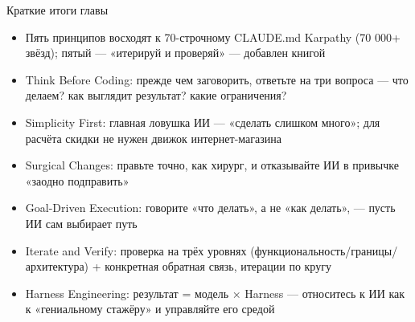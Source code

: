 \begin{tcbsummary}{Краткие итоги главы}
\begin{itemize}
  \item Пять принципов восходят к 70-строчному CLAUDE.md Karpathy (70 000+ звёзд); пятый — «итерируй и проверяй» — добавлен книгой
  \item Think Before Coding: прежде чем заговорить, ответьте на три вопроса — что делаем? как выглядит результат? какие ограничения?
  \item Simplicity First: главная ловушка ИИ — «сделать слишком много»; для расчёта скидки не нужен движок интернет-магазина
  \item Surgical Changes: правьте точно, как хирург, и отказывайте ИИ в привычке «заодно подправить»
  \item Goal-Driven Execution: говорите «что делать», а не «как делать», — пусть ИИ сам выбирает путь
  \item Iterate and Verify: проверка на трёх уровнях (функциональность/границы/архитектура) + конкретная обратная связь, итерации по кругу
  \item Harness Engineering: результат = модель × Harness — относитесь к ИИ как к «гениальному стажёру» и управляйте его средой
\end{itemize}

\end{tcbsummary}
